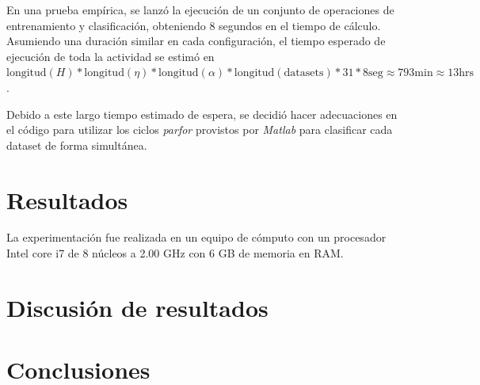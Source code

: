 \documentclass[journal]{IEEEtran}
\begin{document}
En una prueba empírica, se lanzó la ejecución de un conjunto de operaciones de entrenamiento y clasificación, obteniendo 8 segundos en el tiempo de cálculo.
Asumiendo una duración similar en cada configuración, el tiempo esperado de ejecución de toda la actividad se estimó en $\text{longitud}(H) * \text{longitud}(\eta) * \text{longitud}(\alpha) * \text{longitud}(\text{datasets}) * 31 * 8 \text{seg} \approx 793 \text{min} \approx 13 \text{hrs}$.

Debido a este largo tiempo estimado de espera, se decidió hacer adecuaciones en el código para utilizar los ciclos \emph{parfor} provistos por \emph{Matlab} para clasificar cada dataset de forma simultánea.


\section{Resultados} 
\label{sec:resultados}
La experimentación fue realizada en un equipo de cómputo con un procesador Intel core i7 de 8 núcleos a 2.00 GHz con 6 GB de memoria en RAM.




\section{Discusión de resultados}
\label{sec:discusion}


\section{Conclusiones}
\label{sec:conclusiones}


\nocite{*}


\end{document}
